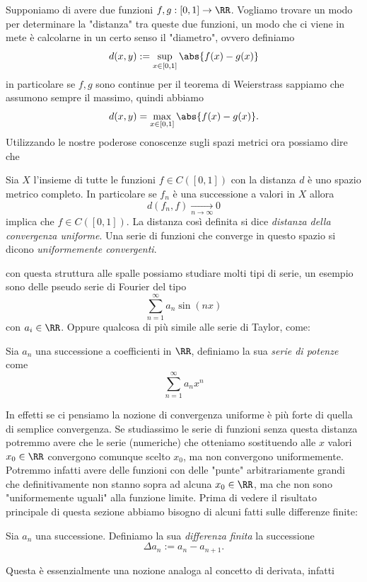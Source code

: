 \documentclass[11pt]{scrartcl}
\begin{document}
  Supponiamo di avere due funzioni $f,g:[0,1]\to\RR$. Vogliamo trovare un modo per determinare la "distanza" tra queste due funzioni, un modo che ci viene in mete è calcolarne in un certo senso il "diametro", ovvero definiamo
	$$d(x,y):=\sup_{x\in[0,1]}\abs{f(x)-g(x)}$$
	in particolare se $f,g$ sono continue per il teorema di Weierstrass sappiamo che assumono sempre il massimo, quindi abbiamo
	$$d(x,y)=\max_{x\in [0,1]}\abs{f(x)-g(x)}.$$
	Utilizzando le nostre poderose conoscenze sugli spazi metrici ora possiamo dire che 
	 \begin{theorem}
	 	Sia $X$ l'insieme di tutte le funzioni $f\in C([0,1])$ con la distanza $d$ è uno spazio metrico completo. In particolare se $f_n$ è una successione a valori in $X$ allora
	 	$$d(f_n,f)\underset{n\to \infty}{\longrightarrow} 0$$
	 	implica che $f\in C([0,1])$. La distanza così definita si dice \textit{distanza della convergenza uniforme}. Una serie di funzioni che converge in questo spazio si dicono \textit{uniformemente convergenti}.
	 \end{theorem}
	 con questa struttura alle spalle possiamo studiare molti tipi di serie, un esempio sono delle pseudo serie di Fourier del tipo
	 $$\sum_{n=1}^\infty a_n\sin (nx)$$
	 con $a_i\in \RR$. Oppure qualcosa di più simile alle serie di Taylor, come:
	 \begin{definition}
	 	Sia $a_n$ una successione a coefficienti in $\RR$, definiamo la sua \textit{serie di potenze} come
	 	$$\sum_{n=1}^{\infty}a_nx^n$$
	 \end{definition}
	 In effetti se ci pensiamo la nozione di convergenza uniforme è più forte di quella di semplice convergenza. Se studiassimo le serie di funzioni senza questa distanza potremmo avere che le serie (numeriche) che otteniamo sostituendo alle $x$ valori $x_0\in\RR$ convergono comunque scelto $x_0$, ma non convergono uniformemente. Potremmo infatti avere delle funzioni con delle "punte" arbitrariamente grandi che definitivamente non stanno sopra ad alcuna $x_0\in\RR$, ma che non sono "uniformemente uguali" alla funzione limite. Prima di vedere il risultato principale di questa sezione abbiamo bisogno di alcuni fatti sulle differenze finite:
	 \begin{definition}
	 	Sia $a_n$ una successione. Definiamo la sua \textit{differenza finita} la successione
	 	$$\Delta a_n := a_{n}-a_{n+1}.$$
	 \end{definition}
	 Questa è essenzialmente una nozione analoga al concetto di derivata, infatti 
\end{document}

